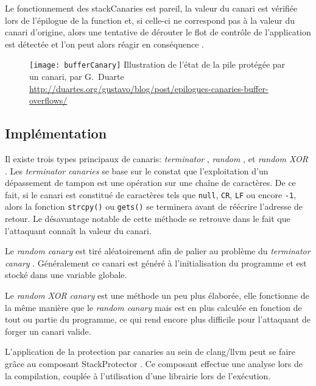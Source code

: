 Le fonctionnement des \og \gls{stackCanaries} \fg est pareil, la valeur du canari est vérifiée lors de l'épilogue de la function et, si celle-ci ne correspond pas à la valeur du canari d'origine, alors une tentative de dérouter le flot de contrôle de l'application est détectée et l'on peut alors réagir en conséquence \cite{EpiloguesCanariesBufferOverflows}.

\begin{figure}[H]
	\centering
	\texttt{[image: bufferCanary]}
	{Illustration de l'état de la pile protégée par un canari, par G.~Duarte}
	{\url{http://duartes.org/gustavo/blog/post/epilogues-canaries-buffer-overflows/}}
	\label{fig:bufferCanary}
\end{figure}

\subsection{Implémentation}

Il existe trois types principaux de canaris: \og \textit{terminator} \fg, \og \textit{random} \fg, et \og \textit{random XOR} \fg \cite{BufferOverflowProtection}. Les \og \textit{terminator canaries} \fg se base sur le constat que l'exploitation d'un dépassement de tampon est une opération sur une chaîne de caractères. De ce fait, si le canari est constitué de caractères tels que \texttt{null}, \texttt{CR}, \texttt{LF} ou encore \texttt{-1}, alors la fonction \texttt{strcpy()} ou \texttt{gets()} se terminera avant de réécrire l'adresse de retour. Le désavantage notable de cette méthode se retrouve dans le fait que l'attaquant connaît la valeur du canari.

Le \og \textit{random canary} \fg est tiré aléatoirement afin de palier au problème du \og \textit{terminator canary} \fg. Généralement ce canari est généré à l'initialisation du programme et est stocké dans une variable globale.

Le \og \textit{random XOR canary} \fg est une méthode un peu plus élaborée, elle fonctionne de la même manière que le \og \textit{random canary} \fg mais est en plus calculée en fonction de tout ou partie du programme, ce qui rend encore plus difficile pour l'attaquant de forger un canari valide.

L'application de la protection par canaries au sein de \gls{clang}/\gls{llvm} peut se faire grâce au composant \og StackProtector \fg \cite{LLVMStackProtector}. Ce composant effectue une analyse lors de la compilation, couplée à l'utilisation d'une librairie lors de l'exécution.

